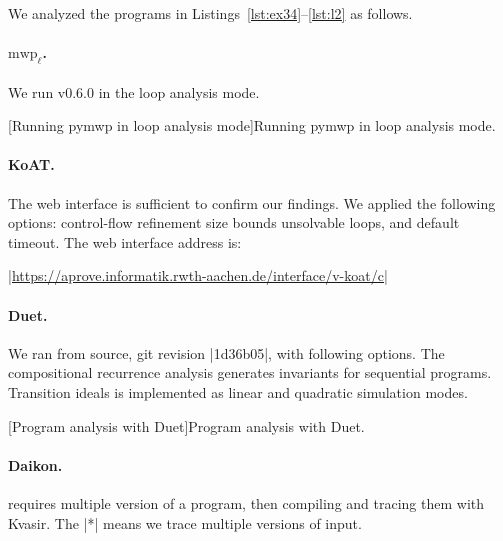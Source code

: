 We analyzed the programs in Listings~\ref{lst:ex34}--\ref{lst:l2} as follows.

\paragraph*{$\text{mwp}_\ell$.}
We run  v0.6.0 in the loop analysis mode.
\begin{center}
\begin{minipage}{\textwidth}
\captionsetup{type=lstlisting}
[Running pymwp in loop analysis mode]{Running pymwp in loop analysis mode.}
\label{lst:mwp-bash}
\end{minipage}
\end{center}

\paragraph*{KoAT.}
The  web interface is sufficient to confirm our findings.
We applied the following options:
\myok{ }control-flow refinement
\myok{ }size bounds
\myok{ }unsolvable loops, and default timeout.
The web interface address is:

\begin{center}
\href{https://aprove.informatik.rwth-aachen.de/interface/v-koat/c}%
{\pr|https://aprove.informatik.rwth-aachen.de/interface/v-koat/c|}
\end{center}

\paragraph*{Duet.}
We ran  from source, git revision \pr|1d36b05|, with following options.
The compositional recurrence analysis generates invariants for sequential programs.
Transition ideals is implemented as linear and quadratic simulation modes.
\begin{center}
\begin{minipage}{\textwidth}
\captionsetup{type=lstlisting}
[Program analysis with Duet]{Program analysis with Duet.}
\label{lst:duet-bash}
\end{minipage}
\end{center}

\paragraph*{Daikon.}
 requires multiple version of a program, then compiling and tracing them with Kvasir.
The \pr|*| means we trace multiple versions of input.
\newline

